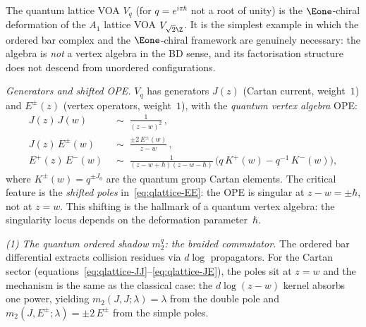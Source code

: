 \begin{conjecture}%
\label{comp:quantum-lattice-voa}%
%
%
%
%
%
%
%
%
The quantum lattice VOA $V_q$ (for $q = e^{i\pi\hbar}$
not a root of unity) is the $\Eone$-chiral deformation
of the $A_1$ lattice VOA $V_{\sqrt{2}\Z}$. It is the
simplest example in which the ordered bar complex and
the $\Eone$-chiral framework are genuinely necessary:
the algebra is \emph{not} a vertex algebra in the BD
sense, and its factorisation structure does not descend
from unordered configurations.

\smallskip
\noindent
\emph{Generators and shifted OPE.}
$V_q$ has generators $J(z)$ (Cartan current, weight~$1$)
and $E^\pm(z)$ (vertex operators, weight~$1$), with the
\emph{quantum vertex algebra} OPE:
\begin{align}
J(z)\,J(w) &\;\sim\;
\frac{1}{(z-w)^2}\,,
\label{eq:qlattice-JJ}
\\[3pt]
J(z)\,E^\pm(w) &\;\sim\;
\frac{\pm 2\, E^\pm(w)}{z-w}\,,
\label{eq:qlattice-JE}
\\[3pt]
E^+(z)\,E^-(w) &\;\sim\;
\frac{1}{(z-w+\hbar)(z-w-\hbar)}\,
\bigl(q\,K^+(w) - q^{-1}\,K^-(w)\bigr),
\label{eq:qlattice-EE}
\end{align}
where $K^\pm(w) = q^{\pm J_0}$ are the quantum group
Cartan elements. The critical feature is the
\emph{shifted poles} in~\eqref{eq:qlattice-EE}: the OPE
is singular at $z - w = \pm\hbar$, not at $z = w$. This
shifting is the hallmark of a quantum vertex algebra:
the singularity locus depends on the deformation
parameter~$\hbar$.

\smallskip
\noindent
\emph{(1) The quantum ordered shadow $m_2^q$: the braided commutator.}
The ordered bar differential extracts collision residues
via $d\log$ propagators. For the Cartan sector
(equations~\eqref{eq:qlattice-JJ}--\eqref{eq:qlattice-JE}),
the poles sit at $z = w$ and the mechanism is the same as
the classical case: the $d\log(z{-}w)$ kernel absorbs one
power, yielding $m_2(J,J;\lambda) = \lambda$ from the
double pole and $m_2(J,E^\pm;\lambda) = \pm 2\, E^\pm$ from
the simple poles.


\end{conjecture}
